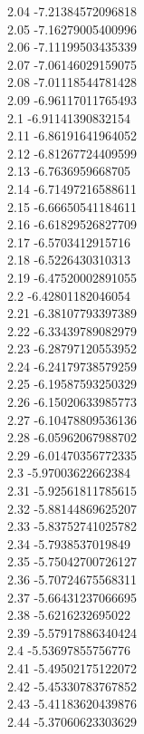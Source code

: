{2.04	-7.21384572096818\\
2.05	-7.16279005400996\\
2.06	-7.11199503435339\\
2.07	-7.06146029159075\\
2.08	-7.01118544781428\\
2.09	-6.96117011765493\\
2.1	-6.91141390832154\\
2.11	-6.86191641964052\\
2.12	-6.81267724409599\\
2.13	-6.7636959668705\\
2.14	-6.71497216588611\\
2.15	-6.66650541184611\\
2.16	-6.61829526827709\\
2.17	-6.5703412915716\\
2.18	-6.5226430310313\\
2.19	-6.47520002891055\\
2.2	-6.42801182046054\\
2.21	-6.38107793397389\\
2.22	-6.33439789082979\\
2.23	-6.28797120553952\\
2.24	-6.24179738579259\\
2.25	-6.19587593250329\\
2.26	-6.15020633985773\\
2.27	-6.10478809536136\\
2.28	-6.05962067988702\\
2.29	-6.01470356772335\\
2.3	-5.97003622662384\\
2.31	-5.92561811785615\\
2.32	-5.88144869625207\\
2.33	-5.83752741025782\\
2.34	-5.7938537019849\\
2.35	-5.75042700726127\\
2.36	-5.70724675568311\\
2.37	-5.66431237066695\\
2.38	-5.6216232695022\\
2.39	-5.57917886340424\\
2.4	-5.53697855756776\\
2.41	-5.49502175122072\\
2.42	-5.45330783767852\\
2.43	-5.41183620439876\\
2.44	-5.37060623303629\\
}
